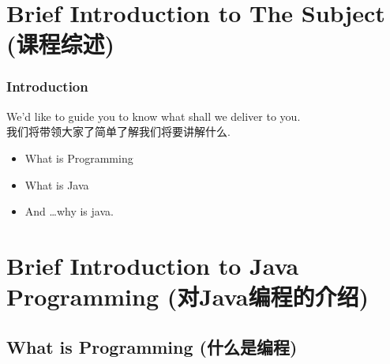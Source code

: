 \documentclass[
  11pt, %
  xcolor=dvipsnames
]{beamer}
\begin{document}
\section{Brief Introduction to The Subject (课程综述)}
\begin{frame}
	\frametitle{Introduction}

	We'd like to guide you to know what shall we deliver to you.\\
	我们将带领大家了简单了解我们将要讲解什么.

	\begin{itemize}
		\item What is Programming
		\item What is Java
		\item And \dots why is java.
	\end{itemize}


\end{frame}


\section{Brief Introduction to Java Programming (对Java编程的介绍)} %


\subsection{What is Programming (什么是编程)}
\end{document}
